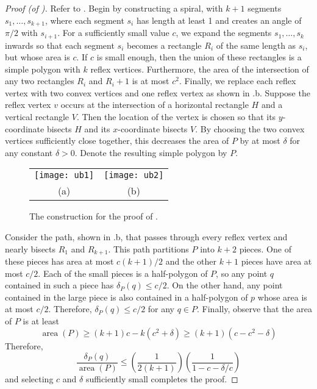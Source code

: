 \documentclass{article}
\DeclareMathOperator{\area}{area}
\begin{document}
\begin{proof}[Proof (of )]
Refer to .
Begin by constructing a spiral, with $k+1$ segments
$s_1,\ldots,s_{k+1}$, where each segment $s_i$ has length at least 1
and creates an angle of $\pi/2$ with $s_{i+1}$.  For a sufficiently
small value $c$, we expand the segments $s_1,\ldots,s_k$ inwards so
that each segment $s_i$ becomes a rectangle $R_i$ of the same length
as $s_i$, but whose area is $c$.  If $c$ is small enough, then the
union of these rectangles is a simple polygon with $k$ reflex
vertices.  Furthermore, the area of the intersection of any two
rectangles $R_i$ and $R_i+1$ is at most $c^2$.  Finally, we replace
each reflex vertex with two convex vertices and one reflex vertex as
shown in .b. Suppose the reflex vertex $v$ occurs
at the intersection of a horizontal rectangle $H$ and a vertical
rectangle $V$.  Then the location of the vertex is chosen so that its
$y$-coordinate bisects $H$ and its $x$-coordinate bisects $V$.  By
choosing the two convex vertices sufficiently close together, this
decreases the area of $P$ by at most $\delta$ for any constant $\delta
> 0$.  Denote
the resulting simple polygon by $P$.

\begin{figure}
  \begin{center}
    \begin{tabular}{cc}
      \texttt{[image: ub1]} & \texttt{[image: ub2]} \\
      (a) & (b)
    \end{tabular}
  \end{center}
  \caption{The construction for the proof of .}
\end{figure}

Consider the path, shown in .b, that passes through
every reflex vertex and nearly bisects $R_1$ and $R_{k+1}$.  This path
partitions $P$ into $k+2$ pieces.  One of these pieces has area at
most $c(k+1)/2$ and the other $k+1$ pieces have area at most $c/2$.
Each of the small pieces is a half-polygon of $P$, so any point $q$
contained in such a piece has $\delta_P(q)\le c/2$.  On the other
hand, any point contained in the large piece is also contained in a
half-polygon of $p$ whose area is at most $c/2$.  Therefore, 
$\delta_P(q)\le c/2$ for any $q\in P$.  Finally, observe that the area
of $P$ is at least
\[
\area(P) \ge (k+1)c - k(c^2+\delta) \ge (k+1)(c-c^2-\delta)
\]
Therefore, 
\[
\frac{\delta_P(q)}{\area(P)} \le
\left(\frac{1}{2(k+1)}\right)\left(\frac{1}{1-c-\delta/c}\right)
\]
and selecting $c$ and $\delta$ sufficiently small completes the proof.
\end{proof}



\end{document}
